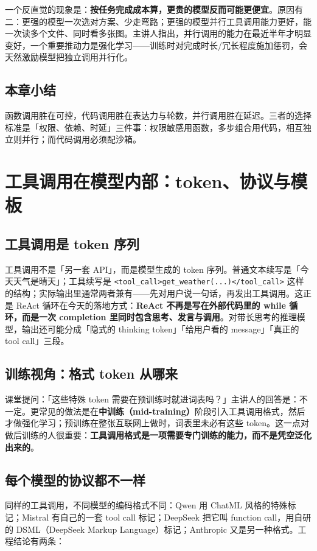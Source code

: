 \documentclass[a4paper]{article}
\begin{document}
一个反直觉的现象是：\textbf{按任务完成成本算，更贵的模型反而可能更便宜}。原因有二：更强的模型一次选对方案、少走弯路；更强的模型并行工具调用能力更好，能一次读多个文件、同时看多张图。主讲人指出，并行调用的能力在最近半年才明显变好，一个重要推动力是强化学习——训练时对完成时长/冗长程度施加惩罚，会天然激励模型把独立调用并行化。

\subsection{本章小结}
函数调用胜在可控，代码调用胜在表达力与轮数，并行调用胜在延迟。三者的选择标准是「权限、依赖、时延」三件事：权限敏感用函数，多步组合用代码，相互独立则并行；而代码调用必须配沙箱。

\section{工具调用在模型内部：token、协议与模板}

\subsection{工具调用是 token 序列}

工具调用不是「另一套 API」，而是模型生成的 token 序列。普通文本续写是「今天天气是晴天」；工具续写是 \texttt{<tool\_call>get\_weather(...)</tool\_call>} 这样的结构；实际输出里通常两者兼有——先对用户说一句话，再发出工具调用。这正是 ReAct 循环在今天的落地方式：\textbf{ReAct 不再是写在外部代码里的 while 循环，而是一次 completion 里同时包含思考、发言与调用}。对带长思考的推理模型，输出还可能分成「隐式的 thinking token」「给用户看的 message」「真正的 tool call」三段。

\subsection{训练视角：格式 token 从哪来}

课堂提问：「这些特殊 token 需要在预训练时就进词表吗？」主讲人的回答是：不一定。更常见的做法是在\textbf{中训练（mid-training）}阶段引入工具调用格式，然后才做强化学习；预训练在整张互联网上做时，词表里未必有这些 token。这一点对做后训练的人很重要：\textbf{工具调用格式是一项需要专门训练的能力，而不是凭空泛化出来的}。

\subsection{每个模型的协议都不一样}

同样的工具调用，不同模型的编码格式不同：Qwen 用 ChatML 风格的特殊标记；Mistral 有自己的一套 tool call 标记；DeepSeek 把它叫 function call，用自研的 DSML（DeepSeek Markup Language）标记；Anthropic 又是另一种格式。工程结论有两条：
\end{document}
